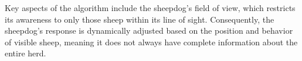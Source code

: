 \documentclass[9pt]{pnas-new}
\begin{document}
Key aspects of the algorithm include the sheepdog's field of view, which restricts its awareness to only those sheep within its line of sight. Consequently, the sheepdog's response is dynamically adjusted based on the position and behavior of visible sheep, meaning it does not always have complete information about the entire herd.

\end{document}
